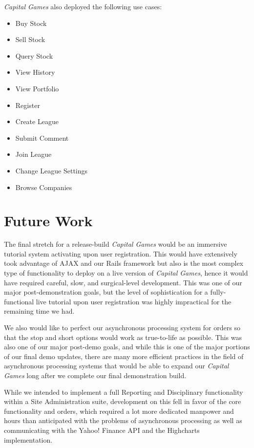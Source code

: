 \textit{Capital Games} also deployed the following use cases:

\begin{itemize}
	\item{Buy Stock}
	\item{Sell Stock}
	\item{Query Stock}
	\item{View History}
	\item{View Portfolio}
	\item{Register}
	\item{Create League}
	\item{Submit Comment}
	\item{Join League}
	\item{Change League Settings}
	\item{Browse Companies}
\end{itemize}

\section{Future Work}

The final stretch for a release-build \textit{Capital Games} would be an immersive tutorial 
system activating upon user registration. This would have extensively took advantage of AJAX 
and our Rails framework but also is the most complex type of functionality to deploy on a live 
version of \textit{Capital Games}, hence it would have required careful, slow, and 
surgical-level development. This was one of our major post-demonstration goals, but the 
level of sophistication for a fully-functional live tutorial upon user registration was 
highly impractical for the remaining time we had.

We also would like to perfect our asynchronous processing system for orders so that 
the stop and short options would work as true-to-life as possible. This was also one of our 
major post-demo goals, and while this is one of the major portions of our final demo updates, 
there are many more efficient practices in the field of asynchronous processing systems that 
would be able to expand our \textit{Capital Games} long after we complete our final 
demonstration build. 

While we intended to implement a full Reporting and Disciplinary functionality within a Site 
Administration suite, development on this fell in favor of the core functionality and orders, 
which required a lot more dedicated manpower and hours than anticipated with the problems of 
asynchronous processing as well as communicating with the Yahoo! Finance API and the 
Highcharts implementation.   

